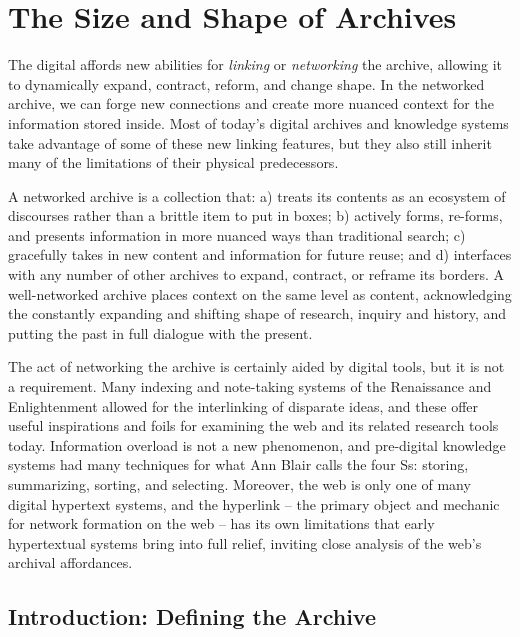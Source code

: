 \chapter{The Size and Shape of Archives}


The digital affords new abilities for \emph{linking} or \emph{networking} the archive, allowing it to dynamically expand, contract, reform, and change shape. In the networked archive, we can forge new connections and create more nuanced context for the information stored inside. Most of today’s digital archives and knowledge systems take advantage of some of these new linking features, but they also still inherit many of the limitations of their physical predecessors.

A networked archive is a collection that: a) treats its contents as an ecosystem of discourses rather than a brittle item to put in boxes; b) actively forms, re-forms, and presents information in more nuanced ways than traditional search; c) gracefully takes in new content and information for future reuse; and d) interfaces with any number of other archives to expand, contract, or reframe its borders. A well-networked archive places context on the same level as content, acknowledging the constantly expanding and shifting shape of research, inquiry and history, and putting the past in full dialogue with the present.

The act of networking the archive is certainly aided by digital tools, but it is not a requirement. Many indexing and note-taking systems of the Renaissance and Enlightenment allowed for the interlinking of disparate ideas, and these offer useful inspirations and foils for examining the web and its related research tools today. Information overload is not a new phenomenon, and pre-digital knowledge systems had many techniques for what Ann Blair calls the four Ss: storing, summarizing, sorting, and selecting.  Moreover, the web is only one of many digital hypertext systems, and the hyperlink – the primary object and mechanic for network formation on the web – has its own limitations that early hypertextual systems bring into full relief, inviting close analysis of the web’s archival affordances.

\section{Introduction: Defining the Archive}


